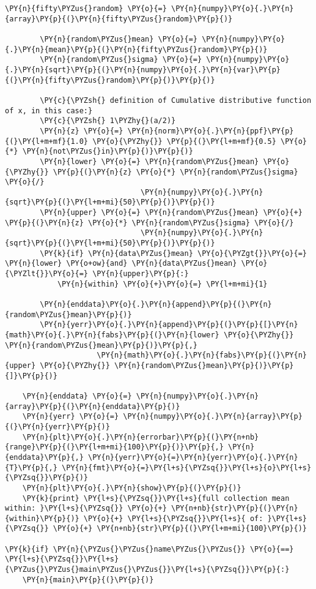 \begin{Verbatim}[commandchars=\\\{\}]
        \PY{n}{fifty\PYZus{}random} \PY{o}{=} \PY{n}{numpy}\PY{o}{.}\PY{n}{array}\PY{p}{(}\PY{n}{fifty\PYZus{}random}\PY{p}{)}

        \PY{n}{random\PYZus{}mean} \PY{o}{=} \PY{n}{numpy}\PY{o}{.}\PY{n}{mean}\PY{p}{(}\PY{n}{fifty\PYZus{}random}\PY{p}{)}
        \PY{n}{random\PYZus{}sigma} \PY{o}{=} \PY{n}{numpy}\PY{o}{.}\PY{n}{sqrt}\PY{p}{(}\PY{n}{numpy}\PY{o}{.}\PY{n}{var}\PY{p}{(}\PY{n}{fifty\PYZus{}random}\PY{p}{)}\PY{p}{)}

        \PY{c}{\PYZsh{} definition of Cumulative distributive function of x, in this case:}
        \PY{c}{\PYZsh{} 1\PYZhy{}(a/2)}
        \PY{n}{z} \PY{o}{=} \PY{n}{norm}\PY{o}{.}\PY{n}{ppf}\PY{p}{(}\PY{l+m+mf}{1.0} \PY{o}{\PYZhy{}} \PY{p}{(}\PY{l+m+mf}{0.5} \PY{o}{*} \PY{n}{not\PYZus{}in}\PY{p}{)}\PY{p}{)}
        \PY{n}{lower} \PY{o}{=} \PY{n}{random\PYZus{}mean} \PY{o}{\PYZhy{}} \PY{p}{(}\PY{n}{z} \PY{o}{*} \PY{n}{random\PYZus{}sigma} \PY{o}{/}
                               \PY{n}{numpy}\PY{o}{.}\PY{n}{sqrt}\PY{p}{(}\PY{l+m+mi}{50}\PY{p}{)}\PY{p}{)}
        \PY{n}{upper} \PY{o}{=} \PY{n}{random\PYZus{}mean} \PY{o}{+} \PY{p}{(}\PY{n}{z} \PY{o}{*} \PY{n}{random\PYZus{}sigma} \PY{o}{/}
                               \PY{n}{numpy}\PY{o}{.}\PY{n}{sqrt}\PY{p}{(}\PY{l+m+mi}{50}\PY{p}{)}\PY{p}{)}
        \PY{k}{if} \PY{n}{data\PYZus{}mean} \PY{o}{\PYZgt{}}\PY{o}{=} \PY{n}{lower} \PY{o+ow}{and} \PY{n}{data\PYZus{}mean} \PY{o}{\PYZlt{}}\PY{o}{=} \PY{n}{upper}\PY{p}{:}
            \PY{n}{within} \PY{o}{+}\PY{o}{=} \PY{l+m+mi}{1}

        \PY{n}{enddata}\PY{o}{.}\PY{n}{append}\PY{p}{(}\PY{n}{random\PYZus{}mean}\PY{p}{)}
        \PY{n}{yerr}\PY{o}{.}\PY{n}{append}\PY{p}{(}\PY{p}{[}\PY{n}{math}\PY{o}{.}\PY{n}{fabs}\PY{p}{(}\PY{n}{lower} \PY{o}{\PYZhy{}} \PY{n}{random\PYZus{}mean}\PY{p}{)}\PY{p}{,}
                     \PY{n}{math}\PY{o}{.}\PY{n}{fabs}\PY{p}{(}\PY{n}{upper} \PY{o}{\PYZhy{}} \PY{n}{random\PYZus{}mean}\PY{p}{)}\PY{p}{]}\PY{p}{)}

    \PY{n}{enddata} \PY{o}{=} \PY{n}{numpy}\PY{o}{.}\PY{n}{array}\PY{p}{(}\PY{n}{enddata}\PY{p}{)}
    \PY{n}{yerr} \PY{o}{=} \PY{n}{numpy}\PY{o}{.}\PY{n}{array}\PY{p}{(}\PY{n}{yerr}\PY{p}{)}
    \PY{n}{plt}\PY{o}{.}\PY{n}{errorbar}\PY{p}{(}\PY{n+nb}{range}\PY{p}{(}\PY{l+m+mi}{100}\PY{p}{)}\PY{p}{,} \PY{n}{enddata}\PY{p}{,} \PY{n}{yerr}\PY{o}{=}\PY{n}{yerr}\PY{o}{.}\PY{n}{T}\PY{p}{,} \PY{n}{fmt}\PY{o}{=}\PY{l+s}{\PYZsq{}}\PY{l+s}{o}\PY{l+s}{\PYZsq{}}\PY{p}{)}
    \PY{n}{plt}\PY{o}{.}\PY{n}{show}\PY{p}{(}\PY{p}{)}
    \PY{k}{print} \PY{l+s}{\PYZsq{}}\PY{l+s}{full collection mean within: }\PY{l+s}{\PYZsq{}} \PY{o}{+} \PY{n+nb}{str}\PY{p}{(}\PY{n}{within}\PY{p}{)} \PY{o}{+} \PY{l+s}{\PYZsq{}}\PY{l+s}{ of: }\PY{l+s}{\PYZsq{}} \PY{o}{+} \PY{n+nb}{str}\PY{p}{(}\PY{l+m+mi}{100}\PY{p}{)}

\PY{k}{if} \PY{n}{\PYZus{}\PYZus{}name\PYZus{}\PYZus{}} \PY{o}{==} \PY{l+s}{\PYZsq{}}\PY{l+s}{\PYZus{}\PYZus{}main\PYZus{}\PYZus{}}\PY{l+s}{\PYZsq{}}\PY{p}{:}
    \PY{n}{main}\PY{p}{(}\PY{p}{)}
\end{Verbatim}
